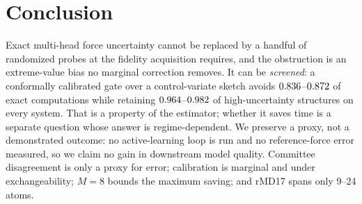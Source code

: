 \documentclass{article}
\begin{document}
\section{Conclusion}
Exact multi-head force uncertainty cannot be replaced by a handful of randomized probes at the
fidelity acquisition requires, and the obstruction is an extreme-value bias no marginal correction
removes. It can be \emph{screened}: a conformally calibrated gate over a control-variate sketch
avoids $0.836$--$0.872$ of exact computations while retaining
$0.964$--$0.982$ of high-uncertainty structures on every system. That is a
property of the estimator; whether it saves time is a separate question whose answer is
regime-dependent. We preserve a proxy, not a demonstrated outcome: no active-learning loop is run and
no reference-force error measured, so we claim no gain in downstream model quality. Committee
disagreement is only a proxy for error; calibration is marginal and under exchangeability; $M{=}8$
bounds the maximum saving; and rMD17 spans only 9--24 atoms.



\end{document}
